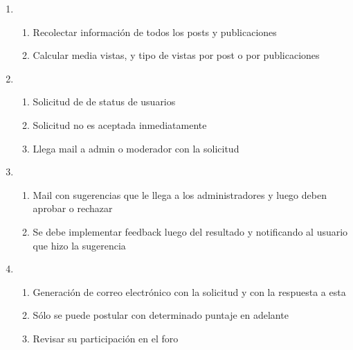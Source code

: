\documentclass[12pt, letterpaper, notitlepage]{article}
\begin{document}
\begin{enumerate}
        \item {}
        \begin{enumerate}
            \item Recolectar información de todos los posts y publicaciones
            \item Calcular media vistas, y tipo de vistas por post o por publicaciones
        \end{enumerate}

        \item {}
        \begin{enumerate}
            \item Solicitud de  de status de usuarios
            \item Solicitud no es aceptada inmediatamente
            \item Llega mail a admin o moderador con la solicitud
        \end{enumerate}

        \item {}
        \begin{enumerate}
            \item Mail con sugerencias que le llega a los administradores y luego deben aprobar o rechazar
            \item Se debe implementar feedback luego del resultado y notificando al usuario que hizo la sugerencia
        \end{enumerate}


        \item {}
        \begin{enumerate}
            \item Generación de correo electrónico con la solicitud y con la respuesta a esta
            \item Sólo se puede postular con determinado puntaje en adelante
            \item Revisar su participación en el foro
        \end{enumerate}


\end{enumerate}
\end{document}
